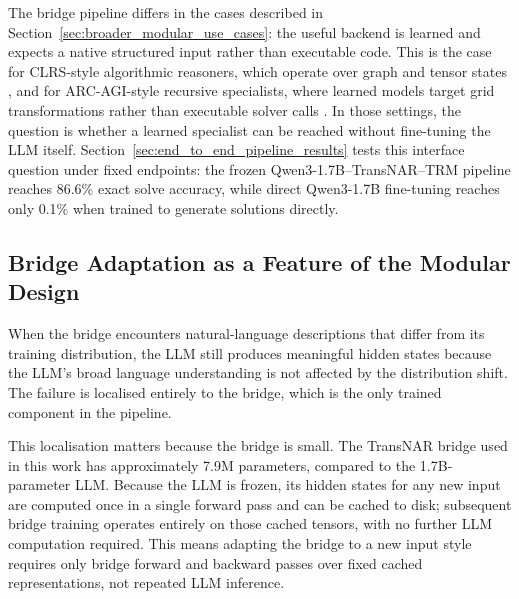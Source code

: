 \documentclass[11pt]{article}
\begin{document}
The bridge pipeline differs in the cases described in Section~\ref{sec:broader_modular_use_cases}: the useful backend is learned and expects a native structured input rather than executable code.
This is the case for CLRS-style algorithmic reasoners, which operate over graph and tensor states \cite{bounsiTransformersMeetNeural2024}, and for ARC-AGI-style recursive specialists, where learned models target grid transformations rather than executable solver calls \cite{cholletARCAGI2NewChallenge2026}.
In those settings, the question is whether a learned specialist can be reached without fine-tuning the LLM itself.
Section~\ref{sec:end_to_end_pipeline_results} tests this interface question under fixed endpoints: the frozen Qwen3-1.7B--TransNAR--TRM pipeline reaches 86.6\% exact solve accuracy, while direct Qwen3-1.7B fine-tuning reaches only 0.1\% when trained to generate solutions directly.

\subsection{Bridge Adaptation as a Feature of the Modular Design}
\label{sec:bridge_ood_adaptation}
\label{sec:limits_text_structure_bridging}

When the bridge encounters natural-language descriptions that differ from its training distribution, the LLM still produces meaningful hidden states because the LLM's broad language understanding is not affected by the distribution shift.
The failure is localised entirely to the bridge, which is the only trained component in the pipeline.

This localisation matters because the bridge is small.
The TransNAR bridge used in this work has approximately 7.9M parameters, compared to the 1.7B-parameter LLM.
Because the LLM is frozen, its hidden states for any new input are computed once in a single forward pass and can be cached to disk; subsequent bridge training operates entirely on those cached tensors, with no further LLM computation required.
This means adapting the bridge to a new input style requires only bridge forward and backward passes over fixed cached representations, not repeated LLM inference.
\end{document}
